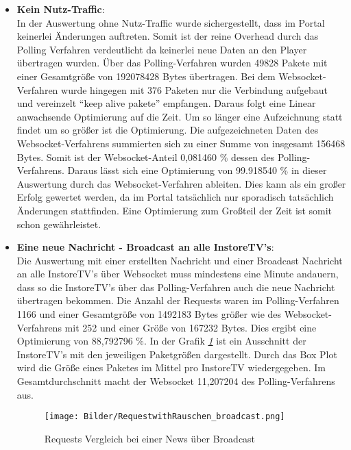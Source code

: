 \begin{itemize}
\item \textbf{Kein Nutz-Traffic}: \\
In der Auswertung ohne Nutz-Traffic wurde sichergestellt, dass im Portal keinerlei Änderungen auftreten. Somit ist der reine Overhead durch das Polling Verfahren verdeutlicht da keinerlei neue Daten an den Player übertragen wurden. Über das Polling-Verfahren wurden 49828 Pakete mit einer Gesamtgröße von 192078428 Bytes übertragen. Bei dem Websocket-Verfahren wurde hingegen mit 376 Paketen nur die Verbindung aufgebaut und vereinzelt "`keep alive pakete"' empfangen. Daraus folgt eine Linear anwachsende Optimierung auf die Zeit. Um so länger eine Aufzeichnung statt findet um so größer ist die Optimierung. Die aufgezeichneten Daten des Websocket-Verfahrens summierten sich zu einer Summe von insgesamt 156468 Bytes. Somit ist der Websocket-Anteil 0,081460 \% dessen des Polling-Verfahrens. Daraus lässt sich eine Optimierung von 99.918540 \% in dieser Auswertung durch das Websocket-Verfahren ableiten. Dies kann als ein großer Erfolg gewertet werden, da im Portal tatsächlich nur sporadisch tatsächlich Änderungen stattfinden. Eine Optimierung zum Großteil der Zeit ist somit schon gewährleistet.

\item \textbf{Eine neue Nachricht - Broadcast an alle InstoreTV's}: \\
Die Auswertung mit einer erstellten Nachricht und einer Broadcast Nachricht an alle InstoreTV's über Websocket muss mindestens eine Minute andauern, dass so die InstoreTV's über das Polling-Verfahren auch die neue Nachricht übertragen bekommen. Die Anzahl der Requests waren im Polling-Verfahren 1166 und einer Gesamtgröße von 1492183 Bytes größer wie des Websocket-Verfahrens mit 252 und einer Größe von 167232 Bytes. Dies ergibt eine Optimierung von 88,792796 \%.
In der Grafik \textit{\ref{fig:RequestwithRauschen_broadcast} } ist ein Ausschnitt der InstoreTV's mit den jeweiligen Paketgrößen dargestellt. Durch das Box Plot wird die Größe eines Paketes im Mittel pro InstoreTV wiedergegeben. Im Gesamtdurchschnitt macht der Websocket 11,207204 des Polling-Verfahrens aus. 

\begin{figure}[h]
 \begin{addmargin}{-0.2\linewidth}
   \centering 
   \texttt{[image: Bilder/RequestwithRauschen\_broadcast.png]}
 \end{addmargin} 
 \caption{Requests Vergleich bei einer News über Broadcast}
 \label{fig:RequestwithRauschen_broadcast}
\end{figure}


\end{itemize}
